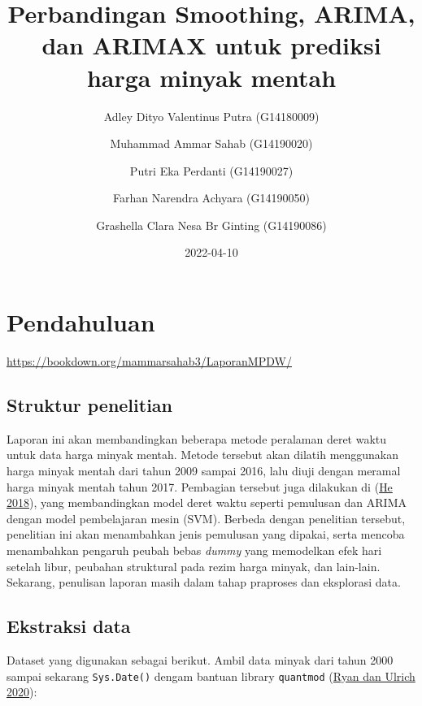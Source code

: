 \documentclass[
]{book}
\title{Perbandingan Smoothing, ARIMA, dan ARIMAX untuk prediksi harga minyak mentah}
\author{Adley Dityo Valentinus Putra (G14180009) \and Muhammad Ammar Sahab (G14190020) \and Putri Eka Perdanti (G14190027) \and Farhan Narendra Achyara (G14190050) \and Grashella Clara Nesa Br Ginting (G14190086)}
\date{2022-04-10}
\begin{document}
\maketitle

{
\setcounter{tocdepth}{1}
\tableofcontents
}
\hypertarget{pendahuluan}{%
\chapter*{Pendahuluan}\label{pendahuluan}}

\url{https://bookdown.org/mammarsahab3/LaporanMPDW/}

\hypertarget{struktur-penelitian}{%
\section*{Struktur penelitian}\label{struktur-penelitian}}

Laporan ini akan membandingkan beberapa metode peralaman deret waktu untuk data harga minyak mentah. Metode tersebut akan dilatih menggunakan harga minyak mentah dari tahun 2009 sampai 2016, lalu diuji dengan meramal harga minyak mentah tahun 2017. Pembagian tersebut juga dilakukan di (\protect\hyperlink{ref-He2018}{He 2018}), yang membandingkan model deret waktu seperti pemulusan dan ARIMA dengan model pembelajaran mesin (SVM). Berbeda dengan penelitian tersebut, penelitian ini akan menambahkan jenis pemulusan yang dipakai, serta mencoba menambahkan pengaruh peubah bebas \emph{dummy} yang memodelkan efek hari setelah libur, peubahan struktural pada rezim harga minyak, dan lain-lain. Sekarang, penulisan laporan masih dalam tahap praproses dan eksplorasi data.

\hypertarget{ekstraksi-data}{%
\section*{Ekstraksi data}\label{ekstraksi-data}}

Dataset yang digunakan sebagai berikut. Ambil data minyak dari tahun 2000 sampai sekarang \texttt{Sys.Date()} dengam bantuan library \texttt{quantmod} (\protect\hyperlink{ref-R-quantmod}{Ryan dan Ulrich 2020}):
\end{document}
